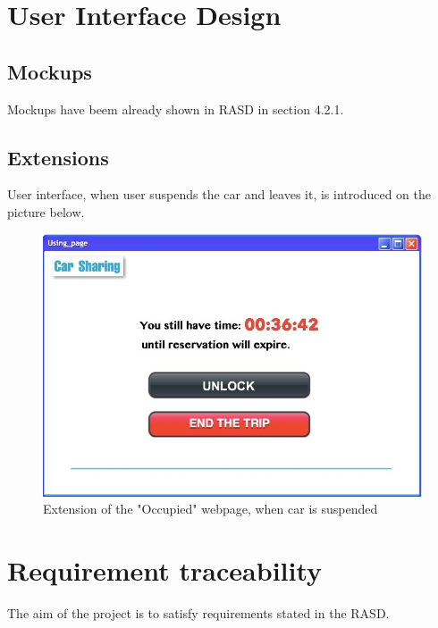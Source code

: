 \documentclass[12pt, letterpaper]{article}
\begin{document}
\newpage
\section{User Interface Design}
\subsection{Mockups}
Mockups have beem already shown in RASD in section 4.2.1.
\subsection{Extensions}
User interface, when user suspends the car and leaves it, is introduced on the picture below.
\begin{figure}[H]
\centering
\includegraphics[width=\textwidth]{Extens.jpg} 
\caption{Extension of the "Occupied" webpage, when car is suspended}
\label{fig:Extens}
\end{figure}

\newpage
\section{Requirement traceability}

The aim of the project is to satisfy requirements stated in the RASD.
\end{document}
